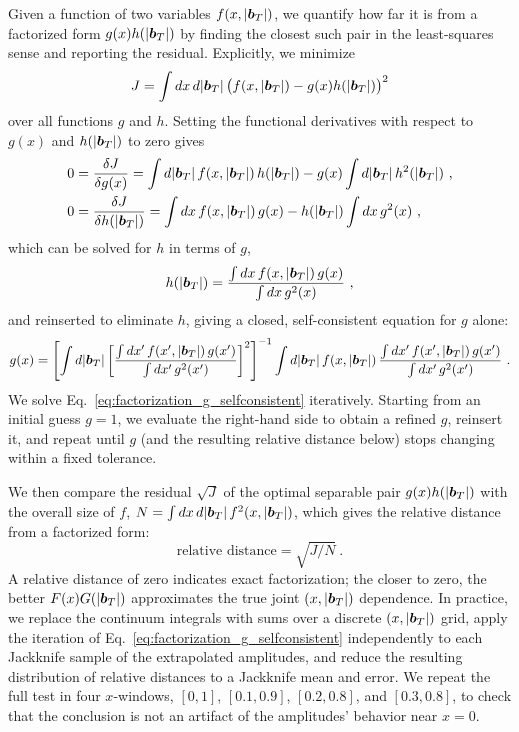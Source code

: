 Given a function of two variables $f(x,|\boldsymbol{b}_T|)$, we quantify how far it is from a factorized form $g(x)h(|\boldsymbol{b}_T|)$ by finding the closest such pair in the least-squares sense and reporting the residual. Explicitly, we minimize
\begin{equation}
    J = \int dx\, d|\boldsymbol{b}_T| \, \big(f(x,|\boldsymbol{b}_T|) - g(x)h(|\boldsymbol{b}_T|)\big)^2
\end{equation}
over all functions $g$ and $h$. Setting the functional derivatives with respect to $g(x)$ and $h(|\boldsymbol{b}_T|)$ to zero gives
\begin{align}
    0 &= \frac{\delta J}{\delta g(x)} = \int d|\boldsymbol{b}_T|\, f(x,|\boldsymbol{b}_T|)\,h(|\boldsymbol{b}_T|) - g(x)\int d|\boldsymbol{b}_T|\, h^2(|\boldsymbol{b}_T|) \ , \\
    0 &= \frac{\delta J}{\delta h(|\boldsymbol{b}_T|)} = \int dx\, f(x,|\boldsymbol{b}_T|)\,g(x) - h(|\boldsymbol{b}_T|)\int dx\, g^2(x) \ ,
\end{align}
which can be solved for $h$ in terms of $g$,
\begin{equation}
    h(|\boldsymbol{b}_T|) = \frac{\int dx\, f(x,|\boldsymbol{b}_T|)\,g(x)}{\int dx\, g^2(x)} \ ,
    \label{eq:factorization_h_solution}
\end{equation}
and reinserted to eliminate $h$, giving a closed, self-consistent equation for $g$ alone:
\begin{equation}
    g(x) = \left[\int d|\boldsymbol{b}_T| \left[\frac{\int dx'\, f(x',|\boldsymbol{b}_T|)\,g(x')}{\int dx'\, g^2(x')}\right]^2\right]^{-1} \int d|\boldsymbol{b}_T|\, f(x,|\boldsymbol{b}_T|)\,\frac{\int dx'\, f(x',|\boldsymbol{b}_T|)\,g(x')}{\int dx'\, g^2(x')} \ .
    \label{eq:factorization_g_selfconsistent}
\end{equation}
We solve Eq.~\eqref{eq:factorization_g_selfconsistent} iteratively. Starting from an initial guess $g=1$, we evaluate the right-hand side to obtain a refined $g$, reinsert it, and repeat until $g$ (and the resulting relative distance below) stops changing within a fixed tolerance.

We then compare the residual $\sqrt{J}$ of the optimal separable pair $g(x)h(|\boldsymbol{b}_T|)$ with the overall size of $f$, $N = \int dx\, d|\boldsymbol{b}_T|\, f^2(x,|\boldsymbol{b}_T|)$, which gives the relative distance from a factorized form:
\begin{equation}
    \text{relative distance} = \sqrt{J/N} \ .
    \label{eq:factorization_relative_distance}
\end{equation}
A relative distance of zero indicates exact factorization; the closer to zero, the better $F(x)G(|\boldsymbol{b}_T|)$ approximates the true joint $(x,|\boldsymbol{b}_T|)$ dependence. In practice, we replace the continuum integrals with sums over a discrete $(x,|\boldsymbol{b}_T|)$ grid, apply the iteration of Eq.~\eqref{eq:factorization_g_selfconsistent} independently to each Jackknife sample of the extrapolated amplitudes, and reduce the resulting distribution of relative distances to a Jackknife mean and error. We repeat the full test in four $x$-windows, $[0,1]$, $[0.1,0.9]$, $[0.2,0.8]$, and $[0.3,0.8]$, to check that the conclusion is not an artifact of the amplitudes' behavior near $x=0$.

